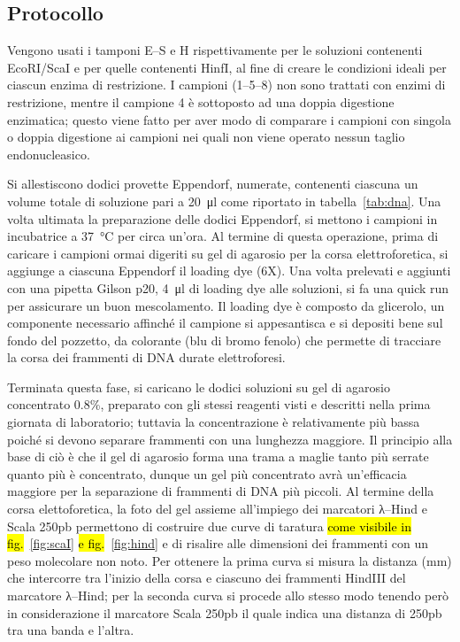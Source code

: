 \documentclass[twocolumn,a4paper,10pt]{my_report}
\begin{document}
\subsection{Protocollo}
\begin{table}[htbp]
\sffamily\scriptsize
\centering

\caption{\label{tab:dna} Vengono usati i tamponi E--S e H rispettivamente per le soluzioni contenenti EcoRI/ScaI e per quelle contenenti HinfI, al fine di creare le condizioni ideali per ciascun enzima di restrizione. I campioni (1--5--8) non sono trattati con enzimi di restrizione, mentre il campione 4 è sottoposto ad una doppia digestione enzimatica; questo viene fatto per aver modo di comparare i campioni con singola o doppia digestione ai campioni nei quali non viene operato nessun taglio endonucleasico.}
\end{table}

Si allestiscono dodici provette Eppendorf, numerate, contenenti ciascuna un volume totale di soluzione pari a \SI{20}{\ul} come riportato in tabella~\ref{tab:dna}.
Una volta ultimata la preparazione delle dodici Eppendorf, si mettono i campioni in incubatrice a \SI{37}{\celsius} per circa un’ora.
Al termine di questa operazione, prima di caricare i campioni ormai digeriti su gel di agarosio per la corsa elettroforetica, si aggiunge a ciascuna Eppendorf il loading dye (6X).
Una volta prelevati e aggiunti con una pipetta Gilson p20, \SI{4}{\ul} di loading dye alle soluzioni, si fa una quick run per assicurare un buon mescolamento.
Il loading dye è composto da glicerolo, un componente necessario affinché il campione si appesantisca e si depositi bene sul fondo del pozzetto, da colorante (blu di bromo fenolo) che permette di tracciare la corsa dei frammenti di DNA durate elettroforesi.

Terminata questa fase, si caricano le dodici soluzioni su gel di agarosio concentrato 0.8\%, preparato con gli stessi reagenti visti e descritti nella prima giornata di laboratorio; tuttavia la concentrazione è relativamente più bassa poiché si devono separare frammenti con una lunghezza maggiore.
Il principio alla base di ciò è che il gel di agarosio forma una trama a maglie tanto più serrate quanto più è concentrato, dunque un gel più concentrato avrà un’efficacia maggiore per la separazione di frammenti di DNA più piccoli.
Al termine della corsa elettoforetica, la foto del gel assieme all’impiego dei marcatori λ--Hind e Scala 250pb permettono di costruire due curve di taratura \hl{come visibile in fig.}~\ref{fig:scaI} \hl{e fig.}~\ref{fig:hind} e di risalire alle dimensioni dei frammenti con un peso molecolare non noto.
Per ottenere la prima curva si misura la distanza (\si{mm}) che intercorre tra l’inizio della corsa e ciascuno dei frammenti HindIII del marcatore λ--Hind; per la seconda curva si procede allo stesso modo tenendo però in considerazione il marcatore Scala 250pb il quale indica una distanza di 250pb tra una banda e l’altra.
\end{document}

